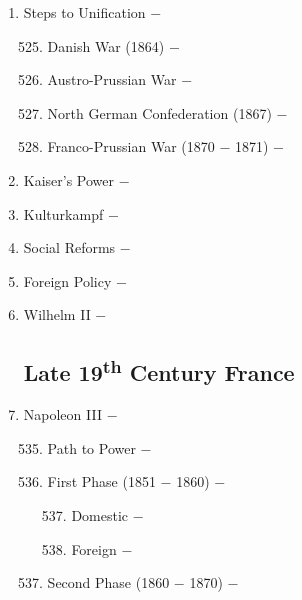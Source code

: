 \documentclass[12pt]{article}
\begin{document}
\begin{enumerate}
\item Steps to Unification $-$ 

\begin{enumerate}[label=\arabic{*}.]
\setcounter{enumii}{524}

\item Danish War (1864) $-$ 

\item Austro-Prussian War $-$ 

\item North German Confederation (1867) $-$ 

\item Franco-Prussian War (1870 $-$ 1871) $-$ 

\end{enumerate}
\setcounter{enumi}{528}


\item Kaiser's Power $-$ 

\item Kulturkampf $-$ 

\item Social Reforms $-$ 

\item Foreign Policy $-$ 

\item Wilhelm II $-$ 

\subsection{Late 19\textsuperscript{th} Century France}

\item Napoleon III $-$ 
\begin{enumerate}[label=\arabic{*}.]
\setcounter{enumii}{534}

\item Path to Power $-$ 

\item First Phase (1851 $-$ 1860) $-$ 

\begin{enumerate}[label=\arabic{*}.]
\setcounter{enumiii}{536}

\item Domestic $-$ 

\item Foreign $-$ 

\end{enumerate}
\setcounter{enumii}{538}

\item Second Phase (1860 $-$ 1870) $-$


\end{enumerate}
\end{enumerate}
\end{document}
